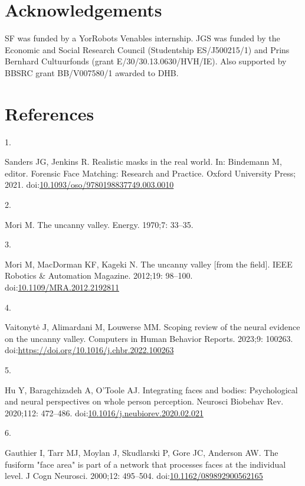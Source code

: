 \documentclass[
]{article}
\newlength{\cslhangindent}
\newlength{\csllabelwidth}
\newenvironment{CSLReferences}[2] %
 {\begin{list}{}{%
  \setlength{\itemindent}{0pt}
  \setlength{\leftmargin}{0pt}
  \setlength{\parsep}{0pt}
  \ifodd #1
   \setlength{\leftmargin}{\cslhangindent}
   \setlength{\itemindent}{-1\cslhangindent}
  \fi
  \setlength{\itemsep}{#2\baselineskip}}}
 {\end{list}}
\newcommand{\CSLLeftMargin}[1]{\parbox[t]{\csllabelwidth}{\strut#1\strut}}
\newcommand{\CSLRightInline}[1]{\parbox[t]{\linewidth - \csllabelwidth}{\strut#1\strut}}
\begin{document}
\section{Acknowledgements}\label{acknowledgements}

SF was funded by a YorRobots Venables internship. JGS was funded by the Economic and Social Research Council (Studentship ES/J500215/1) and Prins Bernhard Cultuurfonds (grant E/30/30.13.0630/HVH/IE). Also supported by BBSRC grant BB/V007580/1 awarded to DHB.

\section*{References}\label{references}

\label{refs}
\begin{CSLReferences}{0}{1}
\CSLLeftMargin{1. }%
\CSLRightInline{Sanders JG, Jenkins R. Realistic masks in the real world. In: Bindemann M, editor. {Forensic Face Matching: Research and Practice}. Oxford University Press; 2021. doi:\href{https://doi.org/10.1093/oso/9780198837749.003.0010}{10.1093/oso/9780198837749.003.0010}}

\CSLLeftMargin{2. }%
\CSLRightInline{Mori M. The uncanny valley. Energy. 1970;7: 33--35. }

\CSLLeftMargin{3. }%
\CSLRightInline{Mori M, MacDorman KF, Kageki N. The uncanny valley {[}from the field{]}. IEEE Robotics \& Automation Magazine. 2012;19: 98--100. doi:\href{https://doi.org/10.1109/MRA.2012.2192811}{10.1109/MRA.2012.2192811}}

\CSLLeftMargin{4. }%
\CSLRightInline{Vaitonytė J, Alimardani M, Louwerse MM. Scoping review of the neural evidence on the uncanny valley. Computers in Human Behavior Reports. 2023;9: 100263. doi:\url{https://doi.org/10.1016/j.chbr.2022.100263}}

\CSLLeftMargin{5. }%
\CSLRightInline{Hu Y, Baragchizadeh A, O'Toole AJ. Integrating faces and bodies: Psychological and neural perspectives on whole person perception. Neurosci Biobehav Rev. 2020;112: 472--486. doi:\href{https://doi.org/10.1016/j.neubiorev.2020.02.021}{10.1016/j.neubiorev.2020.02.021}}

\CSLLeftMargin{6. }%
\CSLRightInline{Gauthier I, Tarr MJ, Moylan J, Skudlarski P, Gore JC, Anderson AW. The fusiform "face area" is part of a network that processes faces at the individual level. J Cogn Neurosci. 2000;12: 495--504. doi:\href{https://doi.org/10.1162/089892900562165}{10.1162/089892900562165}}


\end{CSLReferences}
\end{document}
